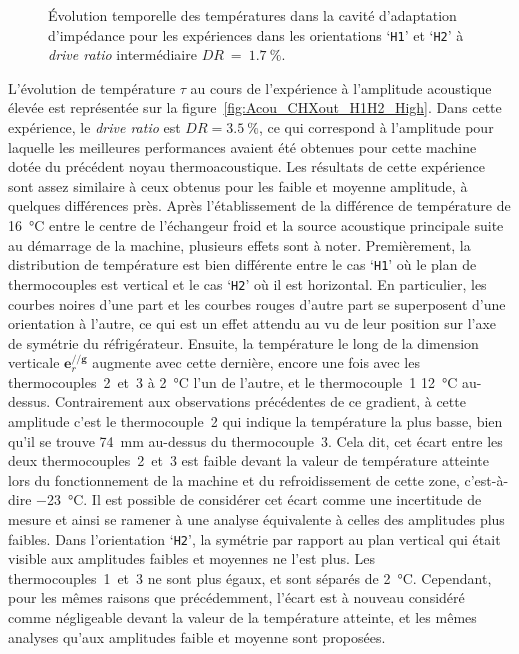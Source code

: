 \begin{figure}[!ht]
    \centering
    
    \caption{\'Evolution temporelle des températures dans la cavité d'adaptation d'impédance pour les expériences dans les orientations `\texttt{H1}' et `\texttt{H2}' à \textit{drive ratio} intermédiaire $DR~=~\qty{1.7}{\percent}$.}
    \label{fig:Acou_CHXout_H1H2_Mid}
\end{figure}

L'évolution de température $\tau$ au cours de l'expérience à l'amplitude acoustique \og élevée \fg{} est représentée sur la figure~\ref{fig:Acou_CHXout_H1H2_High}. Dans cette expérience, le \textit{drive ratio} est $DR=\qty{3.5}{\percent}$, ce qui correspond à l'amplitude pour laquelle les meilleures performances avaient été obtenues pour cette machine dotée du précédent noyau thermoacoustique. Les résultats de cette expérience sont assez similaire à ceux obtenus pour les faible et moyenne amplitude, à quelques différences près. Après l'établissement de la différence de température de \qty{16}{\degreeCelsius} entre le centre de l'échangeur froid et la source acoustique principale suite au démarrage de la machine, plusieurs effets sont à noter. Premièrement, la distribution de température est bien différente entre le cas `\texttt{H1}' où le plan de thermocouples est vertical et le cas `\texttt{H2}' où il est horizontal. En particulier, les courbes noires d'une part et les courbes rouges d'autre part se superposent d'une orientation à l'autre, ce qui est un effet attendu au vu de leur position sur l'axe de symétrie du réfrigérateur. Ensuite, la température le long de la dimension verticale $\mathbf e_r^{//\mathbf g}$ augmente avec cette dernière, encore une fois avec les thermocouples~2~et~3 à \qty{2}{\degreeCelsius} l'un de l'autre, et le thermocouple~1 \qty{12}{\degreeCelsius} au-dessus. Contrairement aux observations précédentes de ce gradient, à cette amplitude c'est le thermocouple~2 qui indique la température la plus basse, bien qu'il se trouve \qty{74}{\milli\meter} au-dessus du thermocouple~3. Cela dit, cet écart entre les deux thermocouples~2~et~3 est faible devant la valeur de température atteinte lors du fonctionnement de la machine et du refroidissement de cette zone, c'est-à-dire \qty{-23}{\degreeCelsius}. Il est possible de considérer cet écart comme une incertitude de mesure et ainsi se ramener à une analyse équivalente à celles des amplitudes plus faibles. Dans l'orientation `\texttt{H2}', la symétrie par rapport au plan vertical qui était visible aux amplitudes faibles et moyennes ne l'est plus. Les thermocouples~1~et~3 ne sont plus égaux, et sont séparés de \qty{2}{\degreeCelsius}. Cependant, pour les mêmes raisons que précédemment, l'écart est à nouveau considéré comme négligeable devant la valeur de la température atteinte, et les mêmes analyses qu'aux amplitudes faible et moyenne sont proposées.

